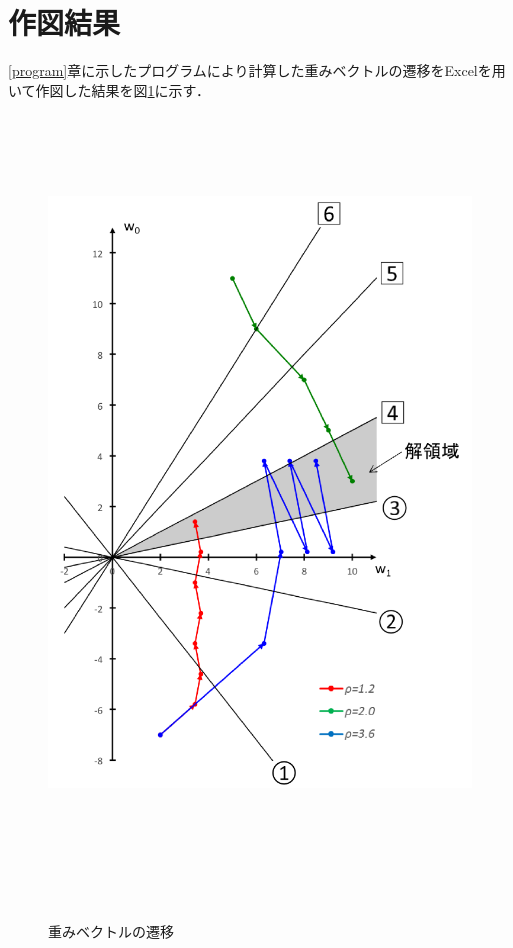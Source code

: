 \documentclass[a4paper]{jarticle}
\begin{document}
\section{作図結果}
\ref{program}章に示したプログラムにより計算した重みベクトルの遷移をExcelを用いて作図した結果を図\ref{graph}に示す．
\begin{figure}[!h]
  \centering
  \includegraphics[height=20cm]{graph2.png}
  \caption{重みベクトルの遷移}
　\label{graph}

\end{figure}
\end{document}
